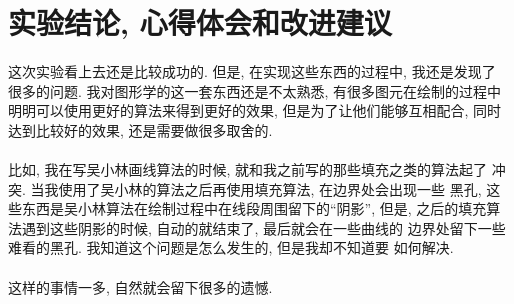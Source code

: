 \documentclass{article}
\begin{document}
\section{实验结论, 心得体会和改进建议}
	\paragraph{}
		这次实验看上去还是比较成功的. 但是, 在实现这些东西的过程中, 我还是发现了
		很多的问题. 我对图形学的这一套东西还是不太熟悉, 有很多图元在绘制的过程中
		明明可以使用更好的算法来得到更好的效果, 但是为了让他们能够互相配合,
		同时达到比较好的效果, 还是需要做很多取舍的. 
	\paragraph{}
		比如, 我在写吴小林画线算法的时候, 就和我之前写的那些填充之类的算法起了
		冲突. 当我使用了吴小林的算法之后再使用填充算法, 在边界处会出现一些
		黑孔, 这些东西是吴小林算法在绘制过程中在线段周围留下的``阴影'', 但是,
		之后的填充算法遇到这些阴影的时候, 自动的就结束了, 最后就会在一些曲线的
		边界处留下一些难看的黑孔.  我知道这个问题是怎么发生的, 但是我却不知道要
		如何解决. 
	\paragraph{}
		这样的事情一多, 自然就会留下很多的遗憾.
\end{document}

